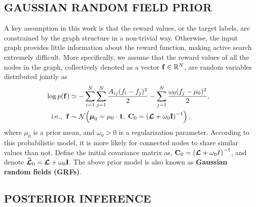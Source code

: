 \subsection{GAUSSIAN RANDOM FIELD PRIOR}
A key assumption in this work is that the reward values, or the target labels, are constrained 
by the graph structure in a non-trivial way. Otherwise,  
the input graph provides little information about the reward function, making active search 
extremely difficult. More specifically,  
we assume that the reward values of all the nodes in the graph, 
collectively denoted as a vector  
$\mathbf{f}\in\mathbb{R}^N$, are random variables distributed jointly as  
\begin{align}
	 \log 
	p(\mathbf{f}) 
	& \simeq
		-\sum_{i=1}^N\sum_{j=1}^N \frac{A_{ij}(f_i-f_j)^2}{2} -   \sum_{j=1}^N  \frac{\omega_0 (f_j-\mu_0)^2}{2}
	,
	\nonumber
	\\
	\mbox{i.e., }\;
	\mathbf{f} &\sim \mathcal{N}\mathopen{}\left(
		\boldsymbol \mu_0 = \mu_0\cdot\mathbf 1,\; 
		{\mathbf C}_0 = \left({\boldsymbol{\mathcal L}} + \omega_0 \mathbf I\right)^{-1}
	\right),
	\label{eq:generative}
\end{align}
where %
$\mu_0$ is a prior mean,
and
$\omega_0 > 0$ is a regularization parameter. 
According to this probabilistic model, it is more likely for connected nodes to share similar values than not.
Define the initial covariance matrix as, ${\mathbf C}_0 = \left({\boldsymbol{\mathcal L}} + \omega_0 I\right)^{-1}$, and denote $\widetilde{{\boldsymbol{\mathcal L}}}_0={\boldsymbol{\mathcal L}}+\omega_0\mathbf I$.
The above prior model is also known as \textbf{Gaussian random fields (GRFs)}.


\subsection{POSTERIOR INFERENCE}

